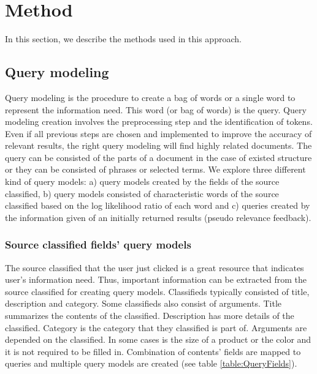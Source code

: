 \chapter{Method}

In this section, we describe the methods used in this approach.

\section{Query modeling}

Query modeling is the procedure to create a bag of words or a single word to represent the information need. This word (or bag of words) is the query. Query modeling creation involves the preprocessing step and the identification of tokens. Even if all previous steps are chosen and implemented to improve the accuracy of relevant results, the right query modeling will find highly related documents. The query can be consisted of the parts of a document in the case of existed structure or they can be consisted of phrases or selected terms. We explore three different kind of query models: a) query models created by the fields of the source classified, b) query models consisted of characteristic words of the source classified based on the log likelihood ratio of each word and c) queries created by the information given of an initially returned results (pseudo relevance feedback).

\subsection{Source classified fields' query models}

The source classified that the user just clicked is a great resource that indicates user's information need. Thus, important information can be extracted from the source classified for creating query models. Classifieds typically consisted of title, description and category. Some classifieds also consist of arguments. Title summarizes the contents of the classified. Description has more details of the classified. Category is the category that they classified is part of. Arguments are depended on the classified. In some cases is the size of a product or the color and it is not required to be filled in. Combination of contents' fields are mapped to queries and multiple query models are created (see table \ref{table:QueryFields}).


